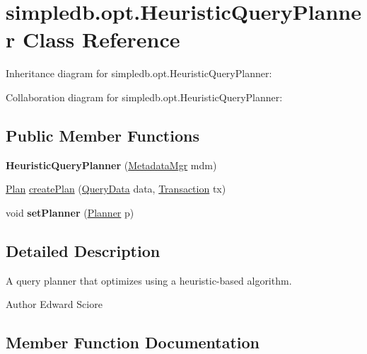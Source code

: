 \hypertarget{classsimpledb_1_1opt_1_1HeuristicQueryPlanner}{}\section{simpledb.\+opt.\+Heuristic\+Query\+Planner Class Reference}
\label{classsimpledb_1_1opt_1_1HeuristicQueryPlanner}


Inheritance diagram for simpledb.\+opt.\+Heuristic\+Query\+Planner\+:


Collaboration diagram for simpledb.\+opt.\+Heuristic\+Query\+Planner\+:
\subsection*{Public Member Functions}
\begin{DoxyCompactItemize}
\item 
\mbox{\label{classsimpledb_1_1opt_1_1HeuristicQueryPlanner_a72c076cf01b210a6ebfe985ee3595d6a}} 
{\bfseries Heuristic\+Query\+Planner} (\hyperlink{classsimpledb_1_1metadata_1_1MetadataMgr}{Metadata\+Mgr} mdm)
\item 
\hyperlink{interfacesimpledb_1_1plan_1_1Plan}{Plan} \hyperlink{classsimpledb_1_1opt_1_1HeuristicQueryPlanner_ae822113f750c0944a227a6de344d35f7}{create\+Plan} (\hyperlink{classsimpledb_1_1parse_1_1QueryData}{Query\+Data} data, \hyperlink{classsimpledb_1_1tx_1_1Transaction}{Transaction} tx)
\item 
\mbox{\label{classsimpledb_1_1opt_1_1HeuristicQueryPlanner_aa1b73dbe834b57a53dfb4c2d70ae14f1}} 
void {\bfseries set\+Planner} (\hyperlink{classsimpledb_1_1plan_1_1Planner}{Planner} p)
\end{DoxyCompactItemize}


\subsection{Detailed Description}
A query planner that optimizes using a heuristic-\/based algorithm. \begin{DoxyAuthor}{Author}
Edward Sciore 
\end{DoxyAuthor}


\subsection{Member Function Documentation}
\mbox{\label{classsimpledb_1_1opt_1_1HeuristicQueryPlanner_ae822113f750c0944a227a6de344d35f7}} 
